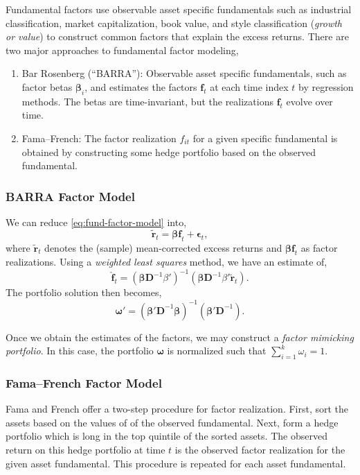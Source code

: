 Fundamental factors use observable asset specific fundamentals such as industrial classification, market capitalization, book value, and style classification (\emph{growth or value}) to construct common factors that explain the excess returns. There are two major approaches to fundamental factor modeling,
\begin{enumerate}
\item Bar Rosenberg (``BARRA''): Observable asset specific fundamentals, such as factor betas $\mathbf{\beta}_i$, and estimates the factors $\mathbf{f}_t$ at each time index $t$ by regression methods. The betas are time-invariant, but the realizations $\mathbf{f}_t$ evolve over time.
\item Fama--French: The factor realization $f_{it}$ for a given specific fundamental is obtained by constructing some hedge portfolio based on the observed fundamental.
\end{enumerate}

\subsubsection{BARRA Factor Model}
We can reduce \eqref{eq:fund-factor-model} into,
\begin{equation}
\tilde{\mathbf{r}}_t = \mathbf{\beta f}_t + \mathbf{\epsilon}_t,
\end{equation}
where $\tilde{\mathbf{r}}_t$ denotes the (sample) mean-corrected excess returns and $\mathbf{\beta f}_t$ as factor realizations. Using a \emph{weighted least squares} method, we have an estimate of,
\begin{equation}
\hat{\mathbf{f}}_t = (\mathbf{\beta D}^{-1}\beta')^{-1} (\mathbf{\beta D}^{-1}\beta'\tilde{\mathbf{r}}_t).
\end{equation}
The portfolio solution then becomes,
\[
\mathbf{\omega}' = (\mathbf{\beta'D}^{-1}\mathbf{\beta})^{-1}(\mathbf{\beta'D}^{-1}).
\]

Once we obtain the estimates of the factors, we may construct a \emph{factor mimicking portfolio}. In this case, the portfolio $\mathbf{\omega}$ is normalized such that $\sum^k_{i=1}\omega_i=1$.

\subsubsection{Fama--French Factor Model}
Fama and French offer a two-step procedure for factor realization. First, sort the assets based on the values of of the observed fundamental. Next, form a hedge portfolio which is long in the top quintile of the sorted assets. The observed return on this hedge portfolio at time $t$ is the observed factor realization for the given asset fundamental. This procedure is repeated for each asset fundamental.

